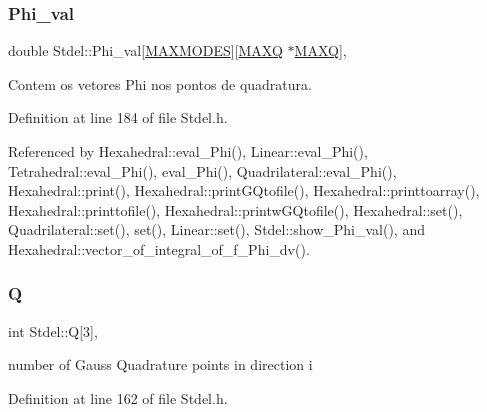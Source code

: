 \mbox{\label{classStdel_ab7849f154bd766857aac9557c19f7f84}} 
\subsubsection{\texorpdfstring{Phi\+\_\+val}{Phi\_val}}
{\footnotesize\ttfamily double Stdel\+::\+Phi\+\_\+val\mbox{[}\hyperlink{MyOptions_8h_aa75ccd382acf88cec3e9c8025c1f88b7}{M\+A\+X\+M\+O\+D\+ES}\mbox{]}\mbox{[}\hyperlink{MyOptions_8h_af708e94d886ba3f59582612949cac702}{M\+A\+XQ} $\ast$\hyperlink{MyOptions_8h_af708e94d886ba3f59582612949cac702}{M\+A\+XQ}\mbox{]}\hspace{0.3cm}{\ttfamily [protected]}, {\ttfamily [inherited]}}



Contem os vetores Phi nos pontos de quadratura. 



Definition at line 184 of file Stdel.\+h.



Referenced by Hexahedral\+::eval\+\_\+\+Phi(), Linear\+::eval\+\_\+\+Phi(), Tetrahedral\+::eval\+\_\+\+Phi(), eval\+\_\+\+Phi(), Quadrilateral\+::eval\+\_\+\+Phi(), Hexahedral\+::print(), Hexahedral\+::print\+G\+Qtofile(), Hexahedral\+::printtoarray(), Hexahedral\+::printtofile(), Hexahedral\+::printw\+G\+Qtofile(), Hexahedral\+::set(), Quadrilateral\+::set(), set(), Linear\+::set(), Stdel\+::show\+\_\+\+Phi\+\_\+val(), and Hexahedral\+::vector\+\_\+of\+\_\+integral\+\_\+of\+\_\+f\+\_\+\+Phi\+\_\+dv().

\mbox{\label{classStdel_a82074e598ad5af5ec45a3257a3c2b684}} 
\subsubsection{\texorpdfstring{Q}{Q}}
{\footnotesize\ttfamily int Stdel\+::Q\mbox{[}3\mbox{]}\hspace{0.3cm}{\ttfamily [protected]}, {\ttfamily [inherited]}}



number of Gauss Quadrature points in direction i 



Definition at line 162 of file Stdel.\+h.



